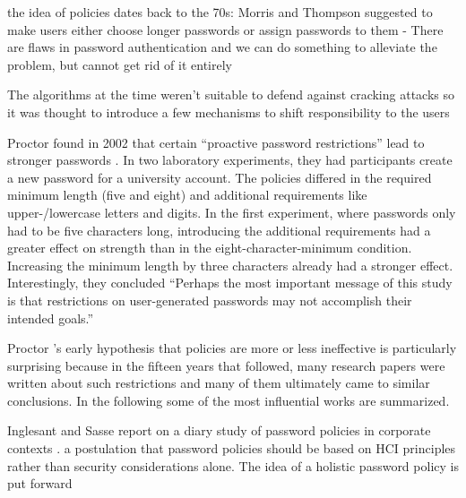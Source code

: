 	
	
	
	the idea of policies dates back to the 70s: Morris and Thompson suggested to make users
	either choose longer passwords or assign passwords to them - There are flaws in password authentication and we can do something to alleviate the problem, but cannot get rid of it entirely \cite{Morris1979PasswordSecurity}
	
	The algorithms at the time weren't suitable to defend against cracking attacks so it was thought to introduce a few mechanisms to shift responsibility to the users \cite{Feldmeier1990UnixPasswordSecurity}
	



	Proctor \etal found in 2002 that certain ``proactive password restrictions'' lead to stronger passwords \cite{Proctor2002ImprovingAuthenticationProactivePasswordRestrictions}. In two laboratory experiments, they had participants create a new password for a university account. The policies differed in the required minimum length (five and eight) and additional requirements like upper-/lowercase letters and digits. In the first experiment, where passwords only had to be five characters long, introducing the additional requirements had a greater effect on strength than in the eight-character-minimum condition. Increasing the minimum length by three characters already had a stronger effect. Interestingly, they concluded ``Perhaps the most important message of this study is that restrictions on user-generated passwords may not accomplish their intended goals.'' 
	
	
	Proctor \etal's early hypothesis that policies are more or less ineffective is particularly surprising because in the fifteen years that followed, many research papers were written about such restrictions and many of them ultimately came to similar conclusions. In the following some of the most influential works are summarized.
	
	Inglesant and Sasse report on a diary study of password policies in corporate contexts \cite{Inglesant2010TrueCostOfUnusablePolicies}. a postulation that password policies should be based on HCI principles rather than security considerations alone. The idea of a holistic password policy is put forward 
	
